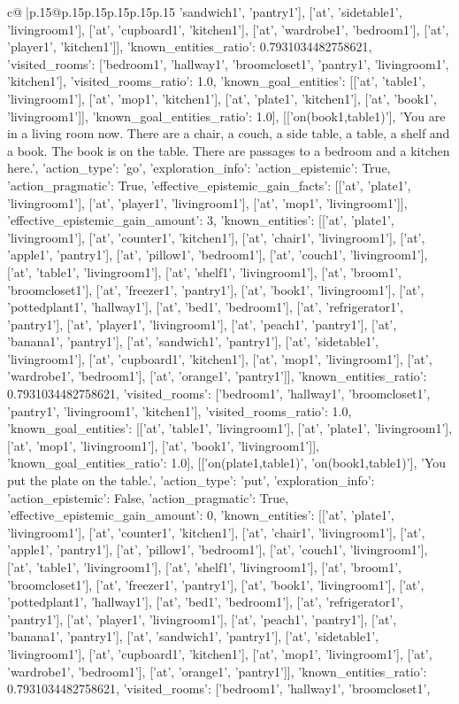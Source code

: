 \documentclass{article}
\begin{document}
{\begin{supertabular}{c@{$\;$}|p{.15\linewidth}@{}p{.15\linewidth}p{.15\linewidth}p{.15\linewidth}p{.15\linewidth}p{.15\linewidth}}
{{{'sandwich1', 'pantry1'], ['at', 'sidetable1', 'livingroom1'], ['at', 'cupboard1', 'kitchen1'], ['at', 'wardrobe1', 'bedroom1'], ['at', 'player1', 'kitchen1']], 'known_entities_ratio': 0.7931034482758621, 'visited_rooms': ['bedroom1', 'hallway1', 'broomcloset1', 'pantry1', 'livingroom1', 'kitchen1'], 'visited_rooms_ratio': 1.0, 'known_goal_entities': [['at', 'table1', 'livingroom1'], ['at', 'mop1', 'kitchen1'], ['at', 'plate1', 'kitchen1'], ['at', 'book1', 'livingroom1']], 'known_goal_entities_ratio': 1.0}}], [['on(book1,table1)'], 'You are in a living room now. There are a chair, a couch, a side table, a table, a shelf and a book. The book is on the table. There are passages to a bedroom and a kitchen here.\n', {'action_type': 'go', 'exploration_info': {'action_epistemic': True, 'action_pragmatic': True, 'effective_epistemic_gain_facts': [['at', 'plate1', 'livingroom1'], ['at', 'player1', 'livingroom1'], ['at', 'mop1', 'livingroom1']], 'effective_epistemic_gain_amount': 3, 'known_entities': [['at', 'plate1', 'livingroom1'], ['at', 'counter1', 'kitchen1'], ['at', 'chair1', 'livingroom1'], ['at', 'apple1', 'pantry1'], ['at', 'pillow1', 'bedroom1'], ['at', 'couch1', 'livingroom1'], ['at', 'table1', 'livingroom1'], ['at', 'shelf1', 'livingroom1'], ['at', 'broom1', 'broomcloset1'], ['at', 'freezer1', 'pantry1'], ['at', 'book1', 'livingroom1'], ['at', 'pottedplant1', 'hallway1'], ['at', 'bed1', 'bedroom1'], ['at', 'refrigerator1', 'pantry1'], ['at', 'player1', 'livingroom1'], ['at', 'peach1', 'pantry1'], ['at', 'banana1', 'pantry1'], ['at', 'sandwich1', 'pantry1'], ['at', 'sidetable1', 'livingroom1'], ['at', 'cupboard1', 'kitchen1'], ['at', 'mop1', 'livingroom1'], ['at', 'wardrobe1', 'bedroom1'], ['at', 'orange1', 'pantry1']], 'known_entities_ratio': 0.7931034482758621, 'visited_rooms': ['bedroom1', 'hallway1', 'broomcloset1', 'pantry1', 'livingroom1', 'kitchen1'], 'visited_rooms_ratio': 1.0, 'known_goal_entities': [['at', 'table1', 'livingroom1'], ['at', 'plate1', 'livingroom1'], ['at', 'mop1', 'livingroom1'], ['at', 'book1', 'livingroom1']], 'known_goal_entities_ratio': 1.0}}], [['on(plate1,table1)', 'on(book1,table1)'], 'You put the plate on the table.\n', {'action_type': 'put', 'exploration_info': {'action_epistemic': False, 'action_pragmatic': True, 'effective_epistemic_gain_amount': 0, 'known_entities': [['at', 'plate1', 'livingroom1'], ['at', 'counter1', 'kitchen1'], ['at', 'chair1', 'livingroom1'], ['at', 'apple1', 'pantry1'], ['at', 'pillow1', 'bedroom1'], ['at', 'couch1', 'livingroom1'], ['at', 'table1', 'livingroom1'], ['at', 'shelf1', 'livingroom1'], ['at', 'broom1', 'broomcloset1'], ['at', 'freezer1', 'pantry1'], ['at', 'book1', 'livingroom1'], ['at', 'pottedplant1', 'hallway1'], ['at', 'bed1', 'bedroom1'], ['at', 'refrigerator1', 'pantry1'], ['at', 'player1', 'livingroom1'], ['at', 'peach1', 'pantry1'], ['at', 'banana1', 'pantry1'], ['at', 'sandwich1', 'pantry1'], ['at', 'sidetable1', 'livingroom1'], ['at', 'cupboard1', 'kitchen1'], ['at', 'mop1', 'livingroom1'], ['at', 'wardrobe1', 'bedroom1'], ['at', 'orange1', 'pantry1']], 'known_entities_ratio': 0.7931034482758621, 'visited_rooms': ['bedroom1', 'hallway1', 'broomcloset1', }}}
\end{supertabular}}
\end{document}
